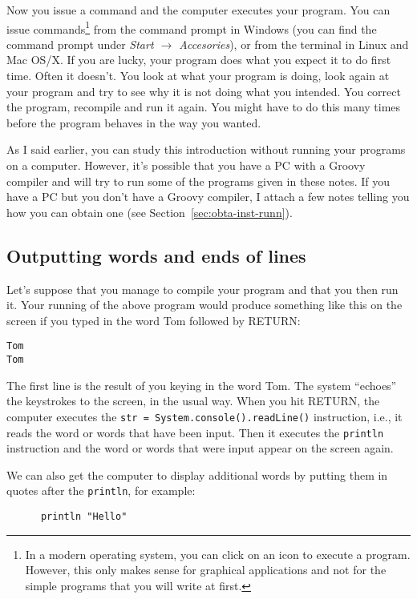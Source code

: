 Now you issue a command and the computer executes
your program. You can issue commands\footnote{In
    a modern operating system, you can click on an icon to execute a
    program. However, this only makes sense for graphical applications
    and not for the simple programs that you will write at first.}
from the command prompt in Windows (you can find the command prompt under 
\emph{Start $\rightarrow$
    Accesories}), or from the terminal in Linux and Mac OS/X.  
If you are lucky, your program does what you expect it 
to do first time.  Often it doesn't.  You look at what your program is
doing, look again at your program and try to see why it is not doing what
you intended.  You correct the program, recompile and run it again.
You might have to do this many times before the program behaves in the way
you wanted.

As I said earlier, you can study this introduction without running your
programs on a computer.  However, it's possible that you have a PC with
a Groovy compiler and will try to run some of the programs given in these
notes. 
If you have a PC but you don't have a Groovy compiler, I attach a few notes telling
you how you can obtain one (see Section~\ref{sec:obta-inst-runn}).


\subsection{Outputting words and ends of lines}

Let's suppose that you manage to compile your program 
and that you then run it.  Your running of the above program
would produce something like this on the screen if you typed in
the word Tom followed by RETURN: 

\begin{Verbatim}
Tom
Tom
\end{Verbatim}

The first line is the result of you keying in the word Tom.  The system ``echoes''
the keystrokes to the screen, in the usual way.  When you hit RETURN, the
computer executes the \verb!str = System.console().readLine()! instruction, 
i.e., it reads the word or words that have been input.  Then it
executes the \verb!println! instruction and the word or words that were
input appear on the screen again.

We can also get the computer to display additional words by putting
them in quotes after the \verb!println!, for example:

\begin{Verbatim}
      println "Hello"
\end{Verbatim}

